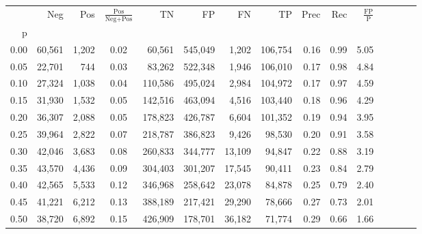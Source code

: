 \begin{tabular}{rrrcrrrrrrrrrrr}
\toprule
{} &     Neg &     Pos & $\frac{\text{Pos}}{\text{Neg}+\text{Pos}}$ &       TN &       FP &       FN &       TP &  Prec &   Rec & $\frac{\text{FP}}{\text{P}}$ \\
p    &         &         &                                            &          &          &          &          &       &       &                              \\
\midrule
0.00 &  60,561 &   1,202 &                                       0.02 &   60,561 &  545,049 &    1,202 &  106,754 &  0.16 &  0.99 &                         5.05 \\
0.05 &  22,701 &     744 &                                       0.03 &   83,262 &  522,348 &    1,946 &  106,010 &  0.17 &  0.98 &                         4.84 \\
0.10 &  27,324 &   1,038 &                                       0.04 &  110,586 &  495,024 &    2,984 &  104,972 &  0.17 &  0.97 &                         4.59 \\
0.15 &  31,930 &   1,532 &                                       0.05 &  142,516 &  463,094 &    4,516 &  103,440 &  0.18 &  0.96 &                         4.29 \\
0.20 &  36,307 &   2,088 &                                       0.05 &  178,823 &  426,787 &    6,604 &  101,352 &  0.19 &  0.94 &                         3.95 \\
0.25 &  39,964 &   2,822 &                                       0.07 &  218,787 &  386,823 &    9,426 &   98,530 &  0.20 &  0.91 &                         3.58 \\
0.30 &  42,046 &   3,683 &                                       0.08 &  260,833 &  344,777 &   13,109 &   94,847 &  0.22 &  0.88 &                         3.19 \\
0.35 &  43,570 &   4,436 &                                       0.09 &  304,403 &  301,207 &   17,545 &   90,411 &  0.23 &  0.84 &                         2.79 \\
0.40 &  42,565 &   5,533 &                                       0.12 &  346,968 &  258,642 &   23,078 &   84,878 &  0.25 &  0.79 &                         2.40 \\
0.45 &  41,221 &   6,212 &                                       0.13 &  388,189 &  217,421 &   29,290 &   78,666 &  0.27 &  0.73 &                         2.01 \\
0.50 &  38,720 &   6,892 &                                       0.15 &  426,909 &  178,701 &   36,182 &   71,774 &  0.29 &  0.66 &                         1.66 \\

\end{tabular}
